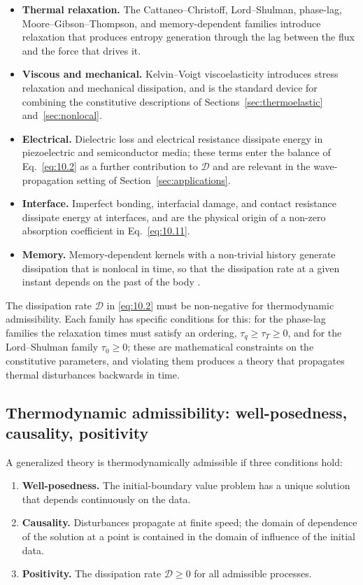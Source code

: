 \begin{itemize}
\item \textbf{Thermal relaxation.} The Cattaneo--Christoff, Lord--Shulman, phase-lag, Moore--Gibson--Thompson, and memory-dependent families introduce relaxation that produces entropy generation through the lag between the flux and the force that drives it.
\item \textbf{Viscous and mechanical.} Kelvin--Voigt viscoelasticity introduces stress relaxation and mechanical dissipation, and is the standard device for combining the constitutive descriptions of Sections~\ref{sec:thermoelastic} and~\ref{sec:nonlocal}.
\item \textbf{Electrical.} Dielectric loss and electrical resistance dissipate energy in piezoelectric and semiconductor media; these terms enter the balance of Eq.~\eqref{eq:10.2} as a further contribution to $\mathcal{D}$ and are relevant in the wave-propagation setting of Section~\ref{sec:applications}.
\item \textbf{Interface.} Imperfect bonding, interfacial damage, and contact resistance dissipate energy at interfaces, and are the physical origin of a non-zero absorption coefficient in Eq.~\eqref{eq:10.11}.
\item \textbf{Memory.} Memory-dependent kernels with a non-trivial history generate dissipation that is nonlocal in time, so that the dissipation rate at a given instant depends on the past of the body \cite{Abouelregal2023}.
\end{itemize}

The dissipation rate $\mathcal{D}$ in \eqref{eq:10.2} must be non-negative for thermodynamic admissibility. Each family has specific conditions for this: for the phase-lag families the relaxation times must satisfy an ordering, $\tau_q \geq \tau_T \geq 0$, and for the Lord--Shulman family $\tau_0 \geq 0$; these are mathematical constraints on the constitutive parameters, and violating them produces a theory that propagates thermal disturbances backwards in time.

\subsection{Thermodynamic admissibility: well-posedness, causality, positivity}
\label{sec:10.7}

A generalized theory is thermodynamically admissible if three conditions hold:

\begin{enumerate}
\item \textbf{Well-posedness.} The initial-boundary value problem has a unique solution that depends continuously on the data.
\item \textbf{Causality.} Disturbances propagate at finite speed; the domain of dependence of the solution at a point is contained in the domain of influence of the initial data.
\item \textbf{Positivity.} The dissipation rate $\mathcal{D} \geq 0$ for all admissible processes.
\end{enumerate}

